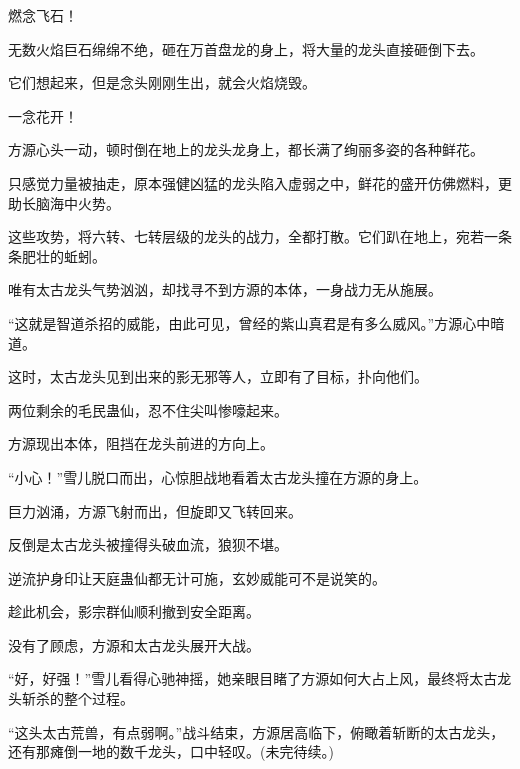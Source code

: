 \begin{this_body}
燃念飞石！

无数火焰巨石绵绵不绝，砸在万首盘龙的身上，将大量的龙头直接砸倒下去。

它们想起来，但是念头刚刚生出，就会火焰烧毁。

一念花开！

方源心头一动，顿时倒在地上的龙头龙身上，都长满了绚丽多姿的各种鲜花。

只感觉力量被抽走，原本强健凶猛的龙头陷入虚弱之中，鲜花的盛开仿佛燃料，更助长脑海中火势。

这些攻势，将六转、七转层级的龙头的战力，全都打散。它们趴在地上，宛若一条条肥壮的蚯蚓。

唯有太古龙头气势汹汹，却找寻不到方源的本体，一身战力无从施展。

“这就是智道杀招的威能，由此可见，曾经的紫山真君是有多么威风。”方源心中暗道。

这时，太古龙头见到出来的影无邪等人，立即有了目标，扑向他们。

两位剩余的毛民蛊仙，忍不住尖叫惨嚎起来。

方源现出本体，阻挡在龙头前进的方向上。

“小心！”雪儿脱口而出，心惊胆战地看着太古龙头撞在方源的身上。

巨力汹涌，方源飞射而出，但旋即又飞转回来。

反倒是太古龙头被撞得头破血流，狼狈不堪。

逆流护身印让天庭蛊仙都无计可施，玄妙威能可不是说笑的。

趁此机会，影宗群仙顺利撤到安全距离。

没有了顾虑，方源和太古龙头展开大战。

“好，好强！”雪儿看得心驰神摇，她亲眼目睹了方源如何大占上风，最终将太古龙头斩杀的整个过程。

“这头太古荒兽，有点弱啊。”战斗结束，方源居高临下，俯瞰着斩断的太古龙头，还有那瘫倒一地的数千龙头，口中轻叹。(未完待续。)

\end{this_body}

